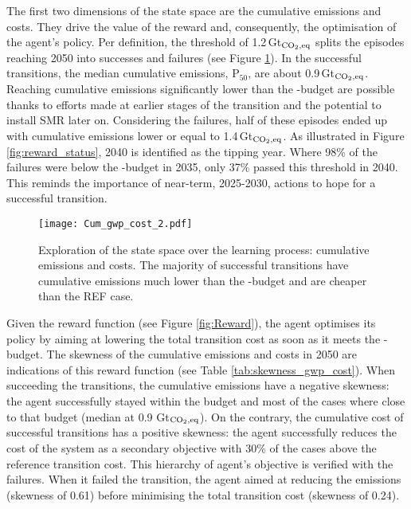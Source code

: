 The first two dimensions of the state space are the cumulative emissions and costs. They drive the value of the reward and, consequently, the optimisation of the agent's policy. Per definition, the threshold of 1.2\,Gt$_{\ce{CO2},\text{eq}}$ splits the episodes reaching 2050 into successes and failures (see Figure \ref{fig:Cum_gwp_cost}). In the successful transitions, the median cumulative emissions, $\text{P}_{50}$, are about 0.9\,Gt$_{\ce{CO2},\text{eq}}$. Reaching cumulative emissions significantly lower than the -budget are possible thanks to efforts made at earlier stages of the transition and the potential to install \gls{SMR} later on. Considering the failures, half of these episodes ended up with cumulative emissions lower or equal to 1.4\,Gt$_{\ce{CO2},\text{eq}}$. As illustrated in Figure \ref{fig:reward_status}, 2040 is identified as the tipping year. Where 98\% of the failures were below the -budget in 2035, only 37\% passed this threshold in 2040. This reminds the importance of near-term, 2025-2030, actions to hope for a successful transition.

\begin{figure}[!htbp]
\centering
\texttt{[image: Cum\_gwp\_cost\_2.pdf]}
\caption{Exploration of the state space over the learning process: cumulative emissions and costs. The majority of successful transitions have cumulative emissions much lower than the -budget and are cheaper than the REF case. }
\label{fig:Cum_gwp_cost}
\end{figure}

Given the reward function (see Figure \ref{fig:Reward}), the agent optimises its policy by aiming at lowering the total transition cost as soon as it meets the -budget. The skewness of the cumulative emissions and costs in 2050 are indications of this reward function (see Table \ref{tab:skewness_gwp_cost}). When succeeding the transitions, the cumulative emissions have a negative skewness: the agent successfully stayed within the budget and most of the cases where close to that budget (median at 0.9 Gt$_{\ce{CO2},\text{eq}}$). On the contrary, the cumulative cost of successful transitions has a positive skewness: the agent successfully reduces the cost of the system as a secondary objective with 30\% of the cases above the reference transition cost. This hierarchy of agent's objective is verified with the failures. When it failed the transition, the agent aimed at reducing the emissions (skewness of 0.61) before minimising the total transition cost (skewness of 0.24). 

